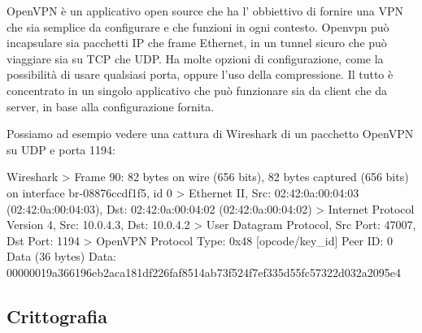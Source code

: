 


OpenVPN è un applicativo open source che ha l' obbiettivo di fornire una VPN che sia semplice da configurare e che funzioni in ogni contesto. Openvpn può incapsulare sia pacchetti IP che frame Ethernet, in un tunnel sicuro che può viaggiare sia su TCP che UDP. Ha molte opzioni di configurazione, come la possibilità di usare qualsiasi porta, oppure l'uso della compressione. Il tutto è concentrato in un singolo applicativo che può funzionare sia da client che da server, in base alla configurazione fornita.

Possiamo ad esempio vedere una cattura di Wireshark di un pacchetto OpenVPN su UDP e porta 1194:

\begin{bashcode}{Wireshark}{}
> Frame 90: 82 bytes on wire (656 bits), 82 bytes captured (656 bits) on interface br-08876ccdf1f5, id 0
> Ethernet II, Src: 02:42:0a:00:04:03 (02:42:0a:00:04:03), Dst: 02:42:0a:00:04:02 (02:42:0a:00:04:02)
> Internet Protocol Version 4, Src: 10.0.4.3, Dst: 10.0.4.2
> User Datagram Protocol, Src Port: 47007, Dst Port: 1194
> OpenVPN Protocol
        Type: 0x48 [opcode/key_id]
        Peer ID: 0
        Data (36 bytes)
            Data: 00000019a366196eb2aca181df226faf8514ab73f524f7ef335d55fc57322d032a2095e4
\end{bashcode}

\subsection{Crittografia}






